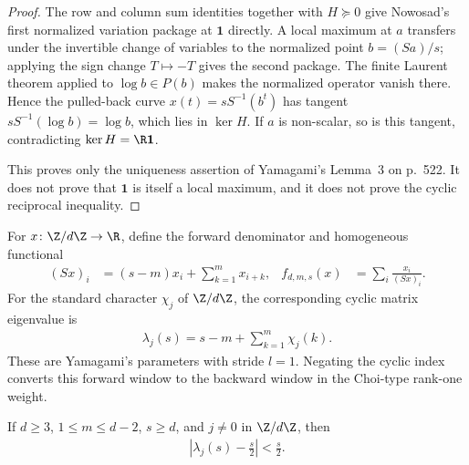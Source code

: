 \begin{proof}
    \leanok
    The row and column sum identities together with $H\succeq0$ give
    Nowosad's first normalized variation package at $\mathbf 1$ directly.
    A local maximum at $a$ transfers under the invertible change of variables
    to the normalized point $b=(Sa)/s$; applying the sign change $T\mapsto-T$
    gives the second package.  The finite Laurent theorem applied to
    $\log b\in P(b)$ makes the normalized operator vanish there.  Hence the
    pulled-back curve $x(t)=sS^{-1}(b^t)$ has tangent
    $sS^{-1}(\log b)=\log b$, which lies in $\ker H$.  If $a$ is non-scalar,
    so is this tangent, contradicting $\ker H=\R\mathbf 1$.

    This proves only the uniqueness assertion of Yamagami's Lemma~3 on
    p.~522.  It does not prove that $\mathbf 1$ is itself a local maximum, and
    it does not prove the cyclic reciprocal inequality.
\end{proof}

\begin{definition}
    \label{def:yamagami_stride_one_reciprocal}
    \leanok
    For $x\colon\Z/d\Z\to\R$, define the forward denominator and homogeneous
    functional
    \begin{align}
        (Sx)_i&=(s-m)x_i+\sum_{k=1}^{m}x_{i+k},
        &f_{d,m,s}(x)&=\sum_i\frac{x_i}{(Sx)_i}.
    \end{align}
    For the standard character $\chi_j$ of $\Z/d\Z$, the corresponding cyclic
    matrix eigenvalue is
    \begin{align}
        \lambda_j(s)=s-m+\sum_{k=1}^{m}\chi_j(k).
    \end{align}
    These are Yamagami's parameters with stride $l=1$.  Negating the cyclic
    index converts this forward window to the backward window in the Choi-type
    rank-one weight.
\end{definition}

\begin{lemma}
    \label{lem:yamagami_stride_one_open_disk}
    \leanok
    If $d\ge3$, $1\le m\le d-2$, $s\ge d$, and $j\ne0$ in $\Z/d\Z$, then
    \begin{align}
        \left|\lambda_j(s)-\frac{s}{2}\right|<\frac{s}{2}.
    \end{align}
\end{lemma}


